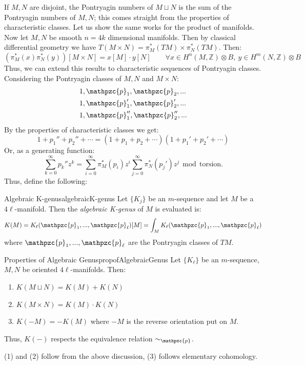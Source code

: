 \documentclass{book}
\newcommand{\Z}{{\mathbb{Z}}}
\newcommand{\cp}{{\mathpzc{p}}}
\renewcommand{\mod}{\,\operatorname{mod}\,}
\newcommand{\dcup}{\sqcup}
\begin{document}
If $M, N$ are disjoint, the Pontryagin numbers of $M\dcup N$ is the sum of the Pontryagin numbers of $M,N$;
this comes straight from the properties of characteristic classes. Let us show the same works for the product
of manifolds. Now let $M,N$ be smooth $n =4k$ dimensional manifolds. Then by classical differential geometry we have
$T(M\times N) = \pi_M^*(TM)\times \pi_N^*(TM)$. Then:
\[
  (\pi_M^*(x)\pi_N^*(y))[M\times N] = x[M]\cdot y[N] \qquad \forall x \in H^n(M,\Z)\otimes B,\ y \in H^m(N,\Z)\otimes B
\]
Thus, we can extend this results to characteristic sequences of Pontryagin classes.
Considering the Pontryagin classes of $M,N$ and $M\times N$:
\begin{align*}
  &1, \cp_1, \cp_2, ...\\
  &1, \cp_1', \cp_2', ...\\
  &1, \cp_1'', \cp_2'', ...\\
\end{align*}
By the properties of characteristic classes we get:
\[
  1 + p_1'' + p_2'' + \cdots = (1 + p_1 + p_2 + \cdots)(1 + p_1' + p_2' + \cdots)
\]
Or, as a generating function:
\[
  \sum_{k=0}^\infty p_k'' z^k = \sum_{i=0}^\infty \pi_M^*(p_i) z^i \sum_{j=0}^\infty \pi_N^*(p_j') z^j \mod \text{torsion}.
\]
Thus, define the following:
\begin{defn}{Algebraic K-genus}{algebraicK-genus}
  Let $\{K_j\}$ be an $m$-sequence and let $M$ be a $4\ell$-manifold. Then the \emph{algebraic K-genus} of
  $M$ is evaluated is:
  \[
    K(M) = K_\ell(\cp_1, ..., \cp_\ell)[M] = \int_M K_\ell(\cp_1, ..., \cp_\ell)
  \]
  where $\cp_1, ..., \cp_\ell$ are the Pontryagin classes of $TM$.
\end{defn}

\begin{prop}{Properties of Algebraic Genus}{propofAlgebraicGenus}
  Let $\{K_\ell\}$ be an $m$-sequence, $M,N$ be oriented $4\ell$-manifolds. Then:
  \begin{enumerate}
    \item $K(M\dcup N) = K(M)+K(N)$
    \item $K(M\times N) = K(M)\cdot K(N)$
    \item $K(-M) = -K(M)$ where $-M$ is the reverse orientation put on $M$.
  \end{enumerate}
  Thus, $K(-)$ respects the equivalence relation $\sim_\cp$.
\end{prop}

\begin{Proof}
  (1) and (2) follow from the above discussion, (3) follows elementary cohomology.
\end{Proof}
\end{document}
